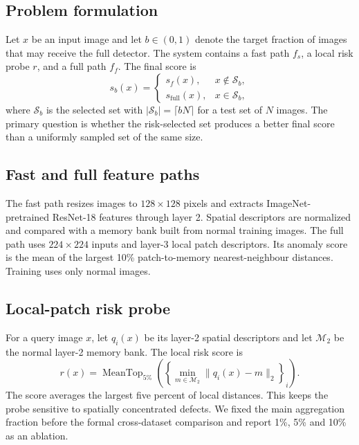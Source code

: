 \documentclass[pdflatex,sn-vancouver-num]{sn-jnl}
\begin{document}
\subsection{Problem formulation}
Let $x$ be an input image and let $b\in(0,1)$ denote the target fraction of images that may receive the full detector. The system contains a fast path $f_s$, a local risk probe $r$, and a full path $f_f$. The final score is
\begin{equation}
s_b(x)=\begin{cases}
s_f(x), & x\notin\mathcal{S}_b,\\
s_{\mathrm{full}}(x), & x\in\mathcal{S}_b,
\end{cases}
\end{equation}
where $\mathcal{S}_b$ is the selected set with $|\mathcal{S}_b|=\lceil bN\rceil$ for a test set of $N$ images. The primary question is whether the risk-selected set produces a better final score than a uniformly sampled set of the same size.

\subsection{Fast and full feature paths}
The fast path resizes images to $128\times128$ pixels and extracts ImageNet-pretrained ResNet-18 features through layer 2. Spatial descriptors are normalized and compared with a memory bank built from normal training images. The full path uses $224\times224$ inputs and layer-3 local patch descriptors. Its anomaly score is the mean of the largest 10\% patch-to-memory nearest-neighbour distances. Training uses only normal images.

\subsection{Local-patch risk probe}
For a query image $x$, let $q_i(x)$ be its layer-2 spatial descriptors and let $\mathcal{M}_2$ be the normal layer-2 memory bank. The local risk score is
\begin{equation}
r(x)=\operatorname{MeanTop}_{5\%}\left(\left\{\min_{m\in\mathcal{M}_2}\lVert q_i(x)-m\rVert_2\right\}_i\right).
\end{equation}
The score averages the largest five percent of local distances. This keeps the probe sensitive to spatially concentrated defects. We fixed the main aggregation fraction before the formal cross-dataset comparison and report 1\%, 5\% and 10\% as an ablation.
\end{document}
